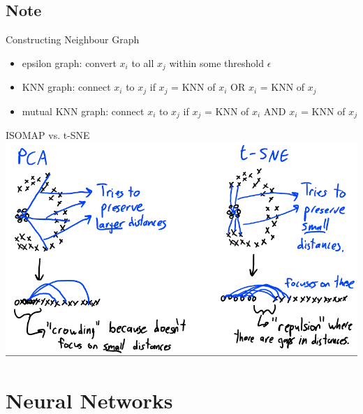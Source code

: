\documentclass[10pt,landscape,a4paper]{article}
\begin{document}
\begin{multicols*}{5}
\subsection{Note}
Constructing Neighbour Graph
\begin{itemize}
    \item epsilon graph: convert \(x_i\) to all \(x_j\) within some threshold \(\epsilon \)
    \item KNN graph: connect \(x_i\) to \(x_j\) if \(x_j\) = KNN of \(x_i\) OR \(x_i\) = KNN of \(x_j\)
    \item mutual KNN graph: connect \(x_i\) to \(x_j\) if \(x_j\) = KNN of \(x_i\) AND \(x_i\) = KNN of \(x_j\)
\end{itemize}
ISOMAP vs. t-SNE \\
\includegraphics[scale=0.15]{isomap_vs_t-sne}

\section{Neural Networks}


\end{multicols*}
\end{document}
